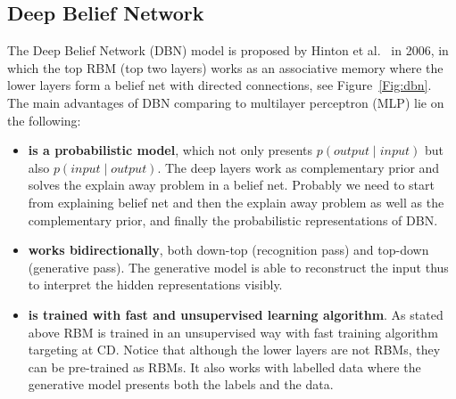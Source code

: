 \subsection{Deep Belief Network}
The Deep Belief Network (DBN) model is proposed by Hinton et al.~\cite{hinton2006fast} in 2006, in which the top RBM (top two layers) works as an associative memory where the lower layers form a belief net with directed connections, see Figure~\ref{Fig:dbn}. %
The main advantages of DBN comparing to multilayer perceptron (MLP) lie on the following:
	\begin{itemize}
	  \item \textbf{is a probabilistic model}, which not only presents $p(output \mid input)$ but also $p(input \mid output)$.
	  The deep layers work as complementary prior and solves the explain away problem in a belief net.
		Probably we need to start from explaining belief net and then the explain away problem as well as the complementary prior, and finally the probabilistic representations of DBN. 
	  \item \textbf{works bidirectionally}, both down-top (recognition pass) and top-down (generative pass).
	  The generative model is able to reconstruct the input thus to interpret the hidden representations visibly.
	  \item \textbf{is trained with fast and unsupervised learning algorithm}.
	  As stated above RBM is trained in an unsupervised way with fast training algorithm targeting at CD.
	  Notice that although the lower layers are not RBMs, they can be pre-trained as RBMs.
	  It also works with labelled data where the generative model presents both the labels and the data. 
	\end{itemize}

